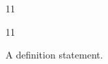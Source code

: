 \documentclass[paper=A4]{ropas-poster}
\begin{document}
\begin{postergrid}{1}{1}
\begin{posterblock}{1}{1}
\begin{definition}A definition statement.\end{definition}
\end{posterblock}
\end{postergrid}
\end{document}
